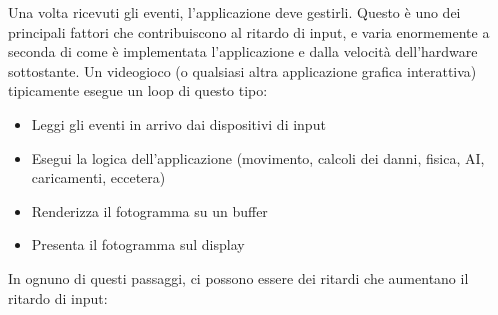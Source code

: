 Una volta ricevuti gli eventi, l'applicazione deve gestirli. Questo è uno dei principali fattori che contribuiscono al ritardo di input, e varia enormemente a seconda di come è implementata l'applicazione e dalla velocità dell'hardware sottostante. Un videogioco (o qualsiasi altra applicazione grafica interattiva) tipicamente esegue un loop di questo tipo:
\begin{itemize}
	\item Leggi gli eventi in arrivo dai dispositivi di input
	\item Esegui la logica dell'applicazione (movimento, calcoli dei danni, fisica, AI, caricamenti, eccetera)
	\item Renderizza il fotogramma su un buffer
	\item Presenta il fotogramma sul display
\end{itemize}
In ognuno di questi passaggi, ci possono essere dei ritardi che aumentano il ritardo di input:

